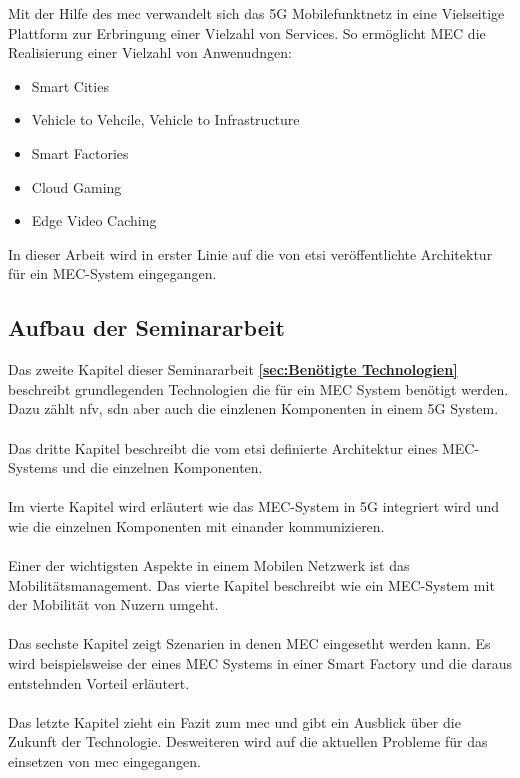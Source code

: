 \documentclass[runningheads]{llncs}
\numberwithin{figure}{section}
\begin{document}
Mit der Hilfe des \acrfull{mec} verwandelt sich das 5G Mobilefunktnetz in eine Vielseitige Plattform zur Erbringung 
einer Vielzahl von Services. So ermöglicht MEC die Realisierung einer Vielzahl von Anwenudngen:
\begin{itemize}
  \item Smart Cities
  \item Vehicle to Vehcile, Vehicle to Infrastructure
  \item Smart Factories
  \item Cloud Gaming 
  \item Edge Video Caching
\end{itemize}
In dieser Arbeit wird in erster Linie auf die von \acrshort{etsi} veröffentlichte Architektur für ein MEC-System eingegangen.
\subsection{Aufbau der Seminararbeit}
Das zweite Kapitel dieser Seminararbeit \textbf{ \ref{sec:Benötigte Technologien}} beschreibt
grundlegenden Technologien die für ein MEC System benötigt werden. Dazu zählt \acrfull{nfv}, \acrfull{sdn} aber auch die einzlenen Komponenten in einem 5G System.
\\
\\
Das dritte Kapitel beschreibt die vom \acrlong{etsi} definierte Architektur eines MEC-Systems und die einzelnen Komponenten.
\\
\\
Im vierte Kapitel wird erläutert wie das MEC-System in 5G integriert wird und wie die einzelnen Komponenten mit einander kommunizieren.
\\
\\
Einer der wichtigsten Aspekte in einem Mobilen Netzwerk ist das Mobilitätsmanagement. Das vierte Kapitel beschreibt wie ein MEC-System mit der Mobilität von
Nuzern umgeht.
\\
\\
Das sechste Kapitel zeigt Szenarien in denen MEC eingesetht werden kann. Es wird beispielsweise der eines MEC Systems in einer Smart Factory und die daraus entstehnden
Vorteil erläutert.
\\
\\
Das letzte Kapitel zieht ein Fazit zum \acrlong{mec} und gibt ein Ausblick über die Zukunft der Technologie. 
Desweiteren wird auf die aktuellen Probleme für das einsetzen von \acrshort{mec} eingegangen.
\end{document}
